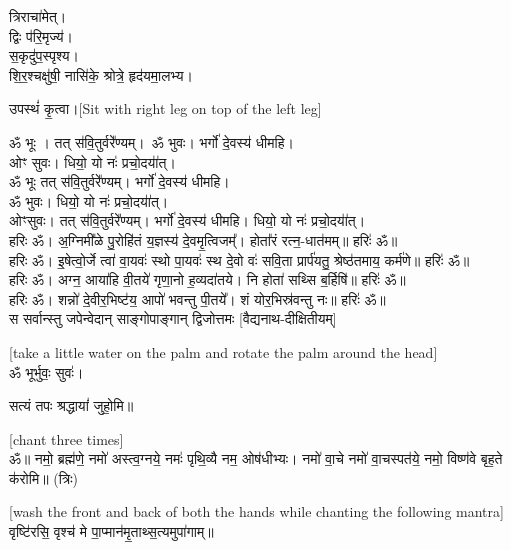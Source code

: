 त्रिराचा॑मेत्।\\
द्विः प॑रि॒मृज्य॑।\\
स॒कृदु॑प॒स्पृश्य।\\
शि॒र॒श्चक्षु॑षी॒ नासि॑के॒ श्रोत्रे॒ हृद॑यमा॒लभ्य।

उपस्थं॑ कृ॒त्वा।{\scriptsize [Sit with right leg on top of the left leg]}

ॐ भूः । तत् स॑वि॒तुर्वरे॑॑ण्यम्।\
ॐ भुवः। भर्गो॑ दे॒वस्य॑ धीमहि।\\
ओꣳ सुवः। धियो॒ यो नः॑ प्रचो॒दया॑॑त्।\\
ॐ भूः तत् स॑वि॒तुर्वरे॑॑ण्यम्। भर्गो॑ दे॒वस्य॑ धीमहि।\\
ॐ भुवः। धियो॒ यो नः॑ प्रचो॒दया॑॑त्।\\
ओꣳसुवः। तत् स॑वि॒तुर्वरे॑॑ण्यम्। भर्गो॑ दे॒वस्य॑ धीमहि। धियो॒ यो नः॑ प्रचो॒दया॑॑त्।\\

हरिः ॐ। अ॒ग्निमी᳚ळे पु॒रोहि॑तं य॒ज्ञस्य॑ दे॒वमृ॒त्विजम्᳚। होता᳚रं रत्न॒-धात॑मम्॥ हरिः॑ ॐ॥\\

हरिः ॐ। इ॒षेत्वो॒र्जे त्वा॑ वा॒यवः॑ स्थो पा॒यवः॑ स्थ दे॒वो वः॑ सवि॒ता प्रार्प॑यतु॒ श्रेष्ठ॑तमाय॒ कर्म॑णे॥ हरिः॑ ॐ॥ \\

हरिः ॐ। अग्न॒ आया॑हि वी॒तये॑ गृणा॒नो ह॒व्यदा॑तये। नि होता॑ सथ्सि ब॒र्हिषि॑॥ हरिः॑ ॐ॥\\

हरिः ॐ। शन्नो॑ दे॒वीर॒भिष्ट॑य॒ आपो॑ भवन्तु पी॒तये᳚। शं योर॒भिस्र॑वन्तु नः॥ हरिः॑ ॐ॥\\

{\centering
{}
{स सर्वान्स्तु जपेन्वेदान् साङ्गोपाङ्गान् द्विजोत्तमः}
}
{\hfill [वैद्यनाथ-दीक्षितीयम्]}

{\scriptsize [take a little water on the palm and rotate the palm around the head]}\\
ॐ भूर्भुवः॒ सुवः॑।

सत्यं तपः श्रद्धायां॑ जुहो॒मि॥


{\scriptsize [chant three times]}\\

ॐ॥ नमो॒ ब्रह्म॑णे॒ नमो॑ अस्त्व॒ग्नये॒ नमः॑ पृथि॒व्यै नम॒ ओष॑धीभ्यः।
नमो॑ वा॒चे नमो॑ वा॒चस्पत॑ये॒ नमो॒ विष्ण॑वे बृह॒ते क॑रोमि॥ (त्रिः)

{\scriptsize [wash the front and back of both the hands while chanting the following mantra]}\\
वृष्टि॑रसि॒ वृश्च॑ मे पा॒प्मान॑मृ॒ताथ्स॒त्यमुपा॑गाम्॥

